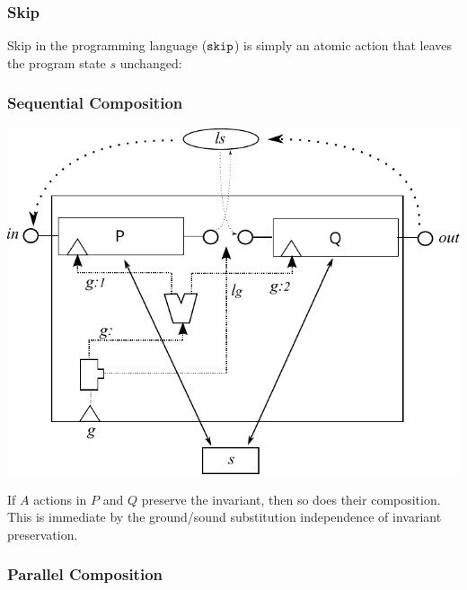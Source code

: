 
\subsubsection{Skip}

Skip in the programming language ($\texttt{skip}$)
is simply an atomic action that leaves the program state $s$ unchanged:

\newpage
\subsubsection{Sequential Composition}

\begin{center}
\includegraphics{images/seq-comp-actual}
\end{center}

If $A$ actions in $P$ and $Q$ preserve the invariant,
then so does their composition.
This is immediate by the ground/sound substitution independence
of invariant preservation.



\newpage
\subsubsection{Parallel Composition}


